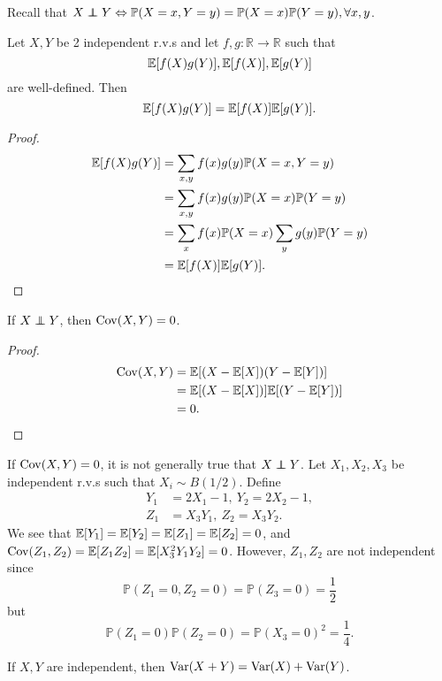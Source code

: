 Recall that $ X\independent Y \Leftrightarrow \mathbb{P}(X=x,Y=y)=\mathbb{P}(X=x)\mathbb{P}(Y=y), \forall x,y $.

\begin{proposition}
    Let $X,Y$ be 2 independent r.v.s and let $ f,g:\mathbb{R} \to \mathbb{R} $ such that
    \[
        {\mathbb{E}}[f(X)g(Y)],{\mathbb{E}}[f(X)],{\mathbb{E}}[g(Y)]
    \]
    are well-defined. Then
    \[
        {\mathbb{E}}[f(X)g(Y)] = {\mathbb{E}}[f(X)]{\mathbb{E}}[g(Y)].
    \]
\end{proposition}
\begin{proof}
    \begin{align*}
        {\mathbb{E}}[f(X)g(Y)]&= \sum_{x,y} f(x)g(y) \mathbb{P}(X=x,Y=y)\\ 
        &= \sum_{x,y} f(x)g(y) \mathbb{P}(X=x)\mathbb{P}(Y=y)\\ 
        &= \sum_{x} f(x)\mathbb{P}(X=x) \sum_y g(y)\mathbb{P}(Y=y)\\ 
        &= {\mathbb{E}}[f(X)]{\mathbb{E}}[g(Y)].\qedhere
    \end{align*}
\end{proof}

\begin{proposition}
    If $ X \independent Y $, then $ \operatorname{Cov}(X,Y)=0 $.
\end{proposition}
\begin{proof}
    \begin{align*}
        \operatorname{Cov}(X,Y) &= {\mathbb{E}}[(X-{\mathbb{E}}[X])(Y-{\mathbb{E}}[Y])] \\
        &= {\mathbb{E}}[(X-{\mathbb{E}}[X])]{\mathbb{E}}[(Y-{\mathbb{E}}[Y])]\\ 
        &= 0.\qedhere
    \end{align*}
\end{proof}
\begin{note}
    If $ \operatorname{Cov}(X,Y)=0 $, it is not generally true that $ X \independent Y $. Let $ X_1,X_2,X_3 $ be independent r.v.s such that $ X_i\sim B(1/2) $. Define 
    \[
        \begin{aligned}
            Y_1 &= 2X_1-1,\  Y_2 = 2X_2-1,\\ 
            Z_1&=X_3Y_1,\ Z_2 =X_3Y_2.
        \end{aligned}
    \]
    We see that $ {\mathbb{E}}[Y_1]={\mathbb{E}}[Y_2]={\mathbb{E}}[Z_1]={\mathbb{E}}[Z_2]=0 $, and $ \operatorname{Cov}(Z_1,Z_2) = {\mathbb{E}}[Z_1Z_2] = {\mathbb{E}}[X_3^2Y_1Y_2]=0 $. However, $ Z_1,Z_2 $ are not independent since 
    \[
        \mathbb{P}(Z_1=0,Z_2=0) = \mathbb{P}(Z_3=0) = \frac{1}{2}
    \]
    but 
    \[
        \mathbb{P}(Z_1=0)\mathbb{P}(Z_2=0) = \mathbb{P}(X_3=0)^2=\frac{1}{4}.
    \]
\end{note}
\begin{corollary}
    If $ X,Y $ are independent, then $ \operatorname{Var}(X+Y) = \operatorname{Var}(X)+\operatorname{Var}(Y) $.
\end{corollary}

